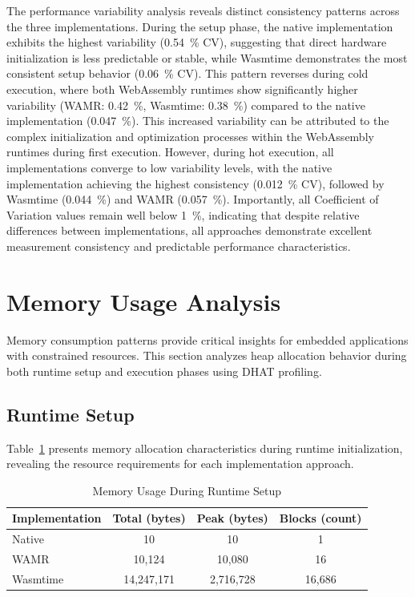 The performance variability analysis reveals distinct consistency patterns across the three implementations. During the setup phase, the native implementation exhibits the highest variability (\SI[round-precision=2]{0.54}{\percent} CV), suggesting that direct hardware initialization is less predictable or stable, while Wasmtime demonstrates the most consistent setup behavior (\SI[round-precision=2]{0.06}{\percent} CV). This pattern reverses during cold execution, where both WebAssembly runtimes show significantly higher variability (WAMR: \SI[round-precision=2]{0.42}{\percent}, Wasmtime: \SI[round-precision=2]{0.38}{\percent}) compared to the native implementation (\SI[round-precision=3]{0.047}{\percent}). This increased variability can be attributed to the complex initialization and optimization processes within the WebAssembly runtimes during first execution. However, during hot execution, all implementations converge to low variability levels, with the native implementation achieving the highest consistency (\SI[round-precision=3]{0.012}{\percent} CV), followed by Wasmtime (\SI[round-precision=3]{0.044}{\percent}) and WAMR (\SI[round-precision=3]{0.057}{\percent}). Importantly, all Coefficient of Variation values remain well below \SI[round-precision=0]{1}{\percent}, indicating that despite relative differences between implementations, all approaches demonstrate excellent measurement consistency and predictable performance characteristics.

\section{Memory Usage Analysis}
\label{sec:eval-memory}

Memory consumption patterns provide critical insights for embedded applications with constrained resources. This section analyzes heap allocation behavior during both runtime setup and execution phases using DHAT profiling.

\subsection{Runtime Setup}
\label{subsec:memory-setup}

Table~\ref{tab:memory-setup} presents memory allocation characteristics during runtime initialization, revealing the resource requirements for each implementation approach.

\begin{table}[h]
    \centering
    \caption{Memory Usage During Runtime Setup}
    \label{tab:memory-setup}
    \begin{tabular}{lccc}
        \toprule
        \textbf{Implementation} & \textbf{Total (bytes)} & \textbf{Peak (bytes)} & \textbf{Blocks (count)} \\
        \midrule
        Native        & 10          & 10        & 1 \\
        WAMR          & 10,124      & 10,080    & 16 \\
        Wasmtime      & 14,247,171  & 2,716,728 & 16,686 \\
        \bottomrule
    \end{tabular}
\end{table}

